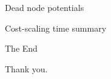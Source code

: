 \documentclass[xcolor={dvipsnames,usenames}]{beamer}
\newcommand{\eps}{\varepsilon}
\begin{document}
\begin{frame}{Dead node potentials}
\end{frame}

\begin{frame}{Cost-scaling time summary}
\end{frame}


\begin{frame}{The End}
\begin{center}
	Thank you.
\end{center}
\end{frame}







%
%
\end{document}
